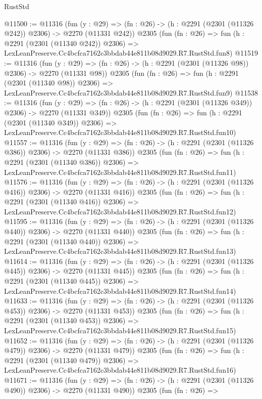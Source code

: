 \begin{lexlean}{RustStd}
\begin{coremodule}
@11500 := @11316
    (fun (y : @29) => (fn : @26) -> (h : @2291 (@2301 (@11326 @242)) @2306) -> @2270 (@11331 @242))
    @2305
    (fun (fn : @26) =>
    fun (h : @2291 (@2301 (@11340 @242)) @2306) =>
    LexLeanPreserve.Cc4bcfca7162c3bbdab44e811b08d9029.R7.RustStd.fun8)
@11519 := @11316
    (fun (y : @29) => (fn : @26) -> (h : @2291 (@2301 (@11326 @98)) @2306) -> @2270 (@11331 @98))
    @2305
    (fun (fn : @26) =>
    fun (h : @2291 (@2301 (@11340 @98)) @2306) =>
    LexLeanPreserve.Cc4bcfca7162c3bbdab44e811b08d9029.R7.RustStd.fun9)
@11538 := @11316
    (fun (y : @29) => (fn : @26) -> (h : @2291 (@2301 (@11326 @349)) @2306) -> @2270 (@11331 @349))
    @2305
    (fun (fn : @26) =>
    fun (h : @2291 (@2301 (@11340 @349)) @2306) =>
    LexLeanPreserve.Cc4bcfca7162c3bbdab44e811b08d9029.R7.RustStd.fun10)
@11557 := @11316
    (fun (y : @29) => (fn : @26) -> (h : @2291 (@2301 (@11326 @386)) @2306) -> @2270 (@11331 @386))
    @2305
    (fun (fn : @26) =>
    fun (h : @2291 (@2301 (@11340 @386)) @2306) =>
    LexLeanPreserve.Cc4bcfca7162c3bbdab44e811b08d9029.R7.RustStd.fun11)
@11576 := @11316
    (fun (y : @29) => (fn : @26) -> (h : @2291 (@2301 (@11326 @416)) @2306) -> @2270 (@11331 @416))
    @2305
    (fun (fn : @26) =>
    fun (h : @2291 (@2301 (@11340 @416)) @2306) =>
    LexLeanPreserve.Cc4bcfca7162c3bbdab44e811b08d9029.R7.RustStd.fun12)
@11595 := @11316
    (fun (y : @29) => (fn : @26) -> (h : @2291 (@2301 (@11326 @440)) @2306) -> @2270 (@11331 @440))
    @2305
    (fun (fn : @26) =>
    fun (h : @2291 (@2301 (@11340 @440)) @2306) =>
    LexLeanPreserve.Cc4bcfca7162c3bbdab44e811b08d9029.R7.RustStd.fun13)
@11614 := @11316
    (fun (y : @29) => (fn : @26) -> (h : @2291 (@2301 (@11326 @445)) @2306) -> @2270 (@11331 @445))
    @2305
    (fun (fn : @26) =>
    fun (h : @2291 (@2301 (@11340 @445)) @2306) =>
    LexLeanPreserve.Cc4bcfca7162c3bbdab44e811b08d9029.R7.RustStd.fun14)
@11633 := @11316
    (fun (y : @29) => (fn : @26) -> (h : @2291 (@2301 (@11326 @453)) @2306) -> @2270 (@11331 @453))
    @2305
    (fun (fn : @26) =>
    fun (h : @2291 (@2301 (@11340 @453)) @2306) =>
    LexLeanPreserve.Cc4bcfca7162c3bbdab44e811b08d9029.R7.RustStd.fun15)
@11652 := @11316
    (fun (y : @29) => (fn : @26) -> (h : @2291 (@2301 (@11326 @479)) @2306) -> @2270 (@11331 @479))
    @2305
    (fun (fn : @26) =>
    fun (h : @2291 (@2301 (@11340 @479)) @2306) =>
    LexLeanPreserve.Cc4bcfca7162c3bbdab44e811b08d9029.R7.RustStd.fun16)
@11671 := @11316
    (fun (y : @29) => (fn : @26) -> (h : @2291 (@2301 (@11326 @490)) @2306) -> @2270 (@11331 @490))
    @2305
    (fun (fn : @26) =>

\end{coremodule}
\end{lexlean}
